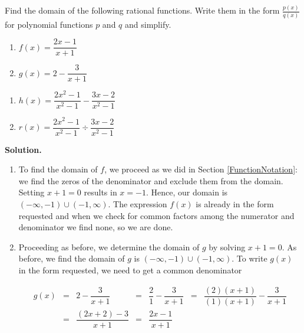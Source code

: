 \begin{ex} \label{ratfuncex} Find the domain of the following rational functions.  Write them in the form $\frac{p(x)}{q(x)}$ for polynomial functions $p$ and $q$ and simplify.

\begin{multicols}{2}
\begin{enumerate}

\item  $f(x) = \dfrac{2x-1}{x+1}$
\item  $g(x) = 2 - \dfrac{3}{x+1}$

\setcounter{HW}{\value{enumi}}
\end{enumerate}
\end{multicols}

\begin{multicols}{2}
\begin{enumerate}
\setcounter{enumi}{\value{HW}}

\item  $h(x) = \dfrac{2x^2-1}{x^2-1} - \dfrac{3x-2}{x^2-1}$
\item  $r(x) = \dfrac{2x^2-1}{x^2-1} \div \dfrac{3x-2}{x^2-1}$

\setcounter{HW}{\value{enumi}}
\end{enumerate}
\end{multicols}

{\bf Solution.}

\begin{enumerate}

\item To find the domain of $f$, we proceed as we did in Section \ref{FunctionNotation}: we find the zeros of the denominator and exclude them from the domain.  Setting $x+1=0$ results in  $x=-1$. Hence, our domain is  $(-\infty, -1) \cup (-1,\infty)$.  The expression $f(x)$ is already in the form requested and when we check for common factors among the numerator and denominator we find none, so we are done.

\item  Proceeding as before, we determine the domain of $g$ by solving $x+1=0$.  As before, we find the domain of $g$ is $(-\infty, -1) \cup (-1,\infty)$.  To write $g(x)$ in the form requested, we need to get a common denominator 

\[ \begin{array}{rclclcl}

g(x) & = & 2 - \dfrac{3}{x+1} & = & \dfrac{2}{1} - \dfrac{3}{x+1} & = & \dfrac{(2)(x+1)}{(1)(x+1)} - \dfrac{3}{x+1} \\ [.15in]
     & = & \dfrac{(2x+2) - 3}{x+1} & = & \dfrac{2x-1}{x+1} & & \\ \end{array} \]


\end{enumerate}
\end{ex}
